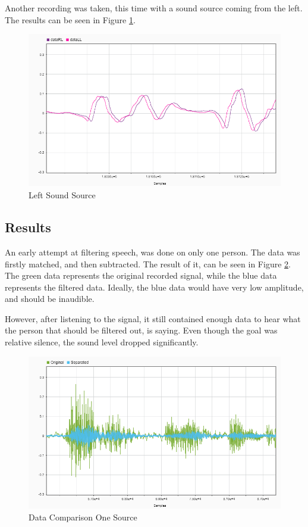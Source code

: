 Another recording was taken, this time with a sound source coming from the left. The results can be seen in
Figure \ref{fig:L}.

\begin{figure}[htp]
  \centering
  \includegraphics[width=0.8\linewidth]{Illustrations/DataL.png}
  \caption{Left Sound Source}
  \label{fig:L}
\end{figure}

\newpage
\subsection*{Results}
An early attempt at filtering speech, was done on only one person. The data was firstly matched, and then 
subtracted. The result of it, can be seen in Figure \ref{fig:oneSourceSepAndOG}. The green data represents 
the original recorded signal, while the blue data represents the filtered data. Ideally, the blue data would
have very low amplitude, and should be inaudible.

However, after listening to the signal, it still contained enough data to hear what the person that should be
filtered out, is saying. Even though the goal was relative silence, the sound level dropped significantly.

\begin{figure}[htp]
  \centering
  \includegraphics[width=\linewidth]{Illustrations/OnePersonOriginalAndSeparated.png}
  \caption{Data Comparison One Source}
  \label{fig:oneSourceSepAndOG}
\end{figure}

